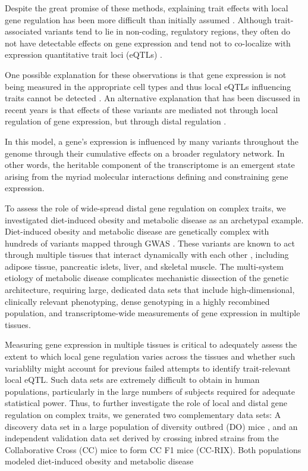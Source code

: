 \documentclass[
]{article}
\begin{document}
Despite the great promise of these methods, explaining trait effects
with local gene regulation has been more difficult than initially
assumed \cite{pmid32912663, pmid36515579}. Although trait-associated
variants tend to lie in non-coding, regulatory regions, they often do
not have detectable effects on gene expression \cite{pmid32912663} and
tend not to co-localize with expression quantitative trait loci (eQTLs)
\cite{pmid36515579, pmid37857933}.

One possible explanation for these observations is that gene expression
is not being measured in the appropriate cell types and thus local eQTLs
influencing traits cannot be detected \cite{pmid32912663}. An
alternative explanation that has been discussed in recent years is that
effects of these variants are mediated not through local regulation of
gene expression, but through distal regulation
\cite{pmid37857933, pmid32424349, 
pmid32831138, pmid30950127}.

In this model, a gene's expression is influenced by many variants
throughout the genome through their cumulative effects on a broader
regulatory network. In other words, the heritable component of the
transcriptome is an emergent state arising from the myriad molecular
interactions defining and constraining gene expression.

To assess the role of wide-spread distal gene regulation on complex
traits, we investigated diet-induced obesity and metabolic disease as an
archetypal example. Diet-induced obesity and metabolic disease are
genetically complex with hundreds of variants mapped through GWAS
\cite{pmid36350656, 
pmid34556834}. These variants are known to act through multiple tissues
that interact dynamically with each other
\cite{pmid28089486, pmid10889786}, including adipose tissue, pancreatic
islets, liver, and skeletal muscle. The multi-system etiology of
metabolic disease complicates mechanistic dissection of the genetic
architecture, requiring large, dedicated data sets that include
high-dimensional, clinically relevant phenotyping, dense genotyping in a
highly recombined population, and transcriptome-wide measurements of
gene expression in multiple tissues.

Measuring gene expression in multiple tissues is critical to adequately
assess the extent to which local gene regulation varies across the
tissues and whether such variablilty might account for previous failed
attempts to identify trait-relevant local eQTL. Such data sets are
extremely difficult to obtain in human populations, particularly in the
large numbers of subjects required for adequate statistical power. Thus,
to further investigate the role of local and distal gene regulation on
complex traits, we generated two complementary data sets: A discovery
data set in a large population of diversity outbred (DO) mice
\cite{pmid22892839}, and an independent validation data set derived by
crossing inbred strains from the Collaborative Cross (CC) mice
\cite{pmid18716833} to form CC F1 mice (CC-RIX). Both populations
modeled diet-induced obesity and metabolic disease \cite{pmid29567659}
\end{document}
